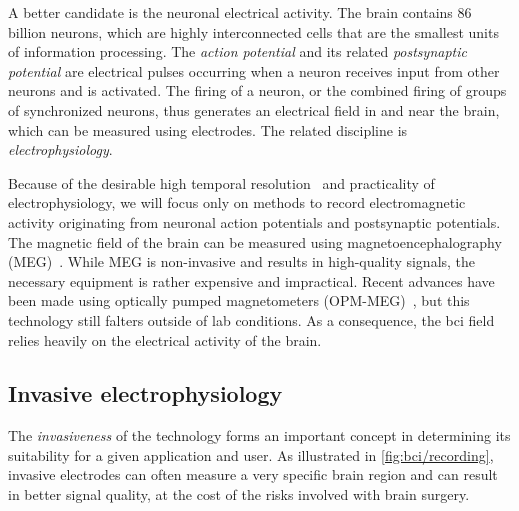 A better candidate is the neuronal electrical activity.
The brain contains 86 billion neurons, which are highly interconnected cells that are
the smallest units of information processing.
The \emph{action potential} and its related \emph{postsynaptic potential} are electrical
pulses occurring when a neuron receives input from other neurons and is activated.
The firing of a neuron, or the combined firing of groups of synchronized neurons, thus
generates an electrical field in and near the brain, which can be measured using
electrodes.
The related discipline is \emph{electrophysiology}.

Because of the desirable high temporal resolution~\cite{Easttom2021} and practicality of
electrophysiology, we will focus only on methods to record electromagnetic activity
originating from neuronal action potentials and postsynaptic potentials.
The magnetic field of the brain can be measured using magnetoencephalography
(MEG)~\cite{Mellinger2007}.
While MEG is non-invasive and results in high-quality signals, the necessary equipment
is rather expensive and impractical.
Recent advances have been made using optically pumped magnetometers
(OPM-MEG)~\cite{Wittevrongel2021}, but this technology still falters outside of lab
conditions.
As a consequence, the \ac{bci} field relies heavily on the electrical activity of the
brain.

\subsection{Invasive electrophysiology}

The \emph{invasiveness} of the technology forms an important concept in determining its
suitability for a given application and user.
As illustrated in \cref{fig:bci/recording}, invasive electrodes can often measure a
very specific brain region and can result in better signal quality, at the cost of the
risks involved with brain surgery.

